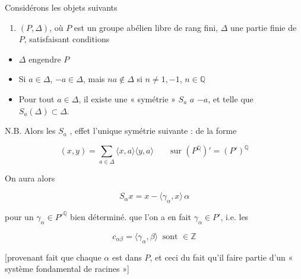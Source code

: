 \documentclass[11pt,a4paper]{article}
\begin{document}


Considérons les objets suivants

\begin{enumerate}
\item[1.] $(P, \Delta)$, où $P$ est un groupe abélien libre de rang fini, $\Delta$
une partie finie de $P$, satisfaisant \ill{} conditions
\end{enumerate}

\begin{itemize}
\item[a)] $\Delta$ engendre $P$
\item[b)] Si $a \in \Delta$, $-a \in \Delta$, mais $na \notin \Delta$ si $n
\neq 1, -1$, $n \in \mathbb{Q}$
\item[c)] Pour tout $a \in \Delta$, il existe une « symétrie » $S_{a}$
 $a$  $-a$, et telle que $S_{a}(\Delta) \subset \Delta$.
\end{itemize}

N.B. Alors les $S_{a}$  , \struck{\ill{}}  effet \add{\ill{}} l'unique symétrie \ill{}
 suivante : \struck{\ill{}}  de la forme

\[
  (x, y) = \sum_{a \in \Delta} \langle x, a\rangle \langle y, a\rangle
  \qquad\text{sur } (P^{\mathbb{Q}})' = (P')^{\mathbb{Q}}
\]

On aura alors

\[
  S_{\alpha}x = x - \langle \gamma_{\alpha}, x\rangle\, \alpha
\]

pour un $\gamma_{\alpha} \in P'^{\mathbb{Q}}$ bien déterminé.  que l'on a en
fait $\gamma_{\alpha} \in P'$, i.e. les

\[
  c_{\alpha\beta} = \langle \gamma_{\alpha}, \beta\rangle \ \text{ sont } \in \mathbb{Z}
\]

[provenant  fait que chaque $\alpha$ est  dans $P$, et ceci du fait
qu'il \ill{} faire partie d'un « système fondamental de racines »]
\end{document}
